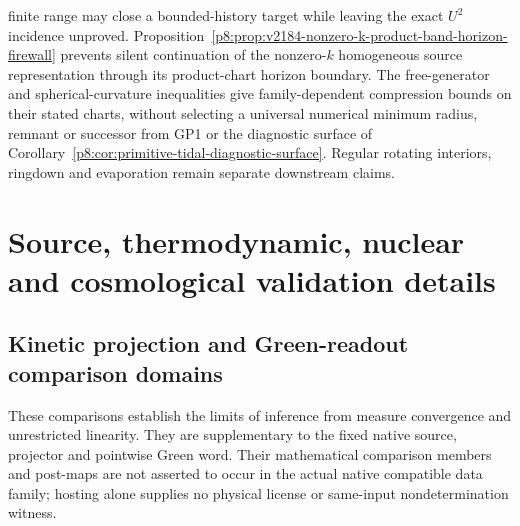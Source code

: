 \documentclass[12pt,a4paper]{article}
\begin{document}
\begin{remark}
finite range may close a bounded-history target while leaving the exact
$U^2$ incidence unproved.  Proposition~\ref{p8:prop:v2184-nonzero-k-product-band-horizon-firewall}
prevents silent continuation of the nonzero-\(k\) homogeneous source
representation through its product-chart horizon boundary. The free-generator and spherical-curvature inequalities give
family-dependent compression bounds on their stated charts, without selecting
a universal numerical minimum radius, remnant or successor from GP1 or the
diagnostic surface of
Corollary~\ref{p8:cor:primitive-tidal-diagnostic-surface}.  Regular rotating
interiors, ringdown and evaporation remain separate downstream claims.
\end{remark}



\section{Source, thermodynamic, nuclear and cosmological validation details}
\label{p6c:sec:c6}


\subsection{Kinetic projection and Green-readout comparison domains}
\label{p8:app:v2187-rar-readout-diagnostics}
These comparisons establish the limits of inference from measure convergence
and unrestricted linearity.  They are supplementary to the fixed native
source, projector and pointwise Green word.  Their mathematical comparison
members and post-maps are not asserted to occur in the actual native
compatible data family; hosting alone supplies no physical license or
same-input nondetermination witness.
\end{document}
